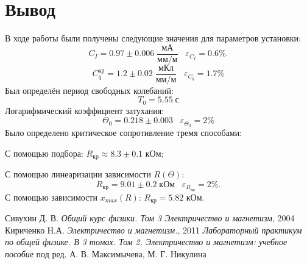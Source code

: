 \documentclass[12pt,a4paper]{article}
\begin{document}
\section*{Вывод}

В ходе работы были получены следующие значения для параметров установки:
$$C_I = 0.97 \pm 0.006\; \frac{\text{мА}}{\text{мм}/\text{м}} \;\;\; \varepsilon_{C_I} = 0.6\%. $$
$$C_q^\text{кр} = 1.2 \pm 0.02\; \frac{\text{мКл}}{\text{мм}/\text{м}} \;\;\; \varepsilon_{C_q}= 1.7\%$$
Был определён период свободных колебаний:
$$T_0=5.55 \; \text{с}$$
Логарифмический коэффициент затухания:
$$\Theta_0 = 0.218 \pm 0.003 \;\;\; \varepsilon_{\Theta_0} = 2\%$$
Было определено критическое сопротивление тремя способами:\newline

С помощью подбора:  $R_\text{кр} \approx 8.3 \pm 0.1$ кОм;\newline

С помощью линеаризации зависимости $R(\Theta)$: $$ R_\text{кр} = 9.01 \pm 0.2\; \text{кОм} \;\;\; \varepsilon_{R_\text{кр}} = 2\%. $$ 
С помощью зависимости $x_{max}(R)$: $R_\text{кр} = 5.82$ кОм.

\newpage
\begin{thebibliography}{9}
	 Сивухин Д. В. \emph{Общий курс физики. Том 3 Электричество и магнетизм}, 2004
	 Кириченко Н.А. \emph{Электричество и магнетизм.}, 2011
	 \emph{Лабораторный практикум по общей физике. В 3 томах. Том 2. Электричество и магнетизм: учебное пособие} под ред. А. В. Максимычева, М. Г. Никулина
\end{thebibliography}
\end{document}

